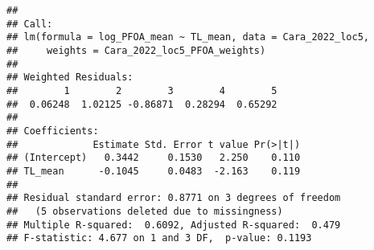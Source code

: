 \documentclass[
]{article}
\newenvironment{Shaded}{\begin{snugshade}}{\end{snugshade}}
\newcommand{\AttributeTok}[1]{\textcolor[rgb]{0.13,0.29,0.53}{#1}}
\newcommand{\DecValTok}[1]{\textcolor[rgb]{0.00,0.00,0.81}{#1}}
\newcommand{\FunctionTok}[1]{\textcolor[rgb]{0.13,0.29,0.53}{\textbf{#1}}}
\newcommand{\NormalTok}[1]{#1}
\newcommand{\OtherTok}[1]{\textcolor[rgb]{0.56,0.35,0.01}{#1}}
\newcommand{\SpecialCharTok}[1]{\textcolor[rgb]{0.81,0.36,0.00}{\textbf{#1}}}
\newcommand{\StringTok}[1]{\textcolor[rgb]{0.31,0.60,0.02}{#1}}
\begin{document}
\begin{Shaded}
\end{Shaded}

\begin{verbatim}
## 
## Call:
## lm(formula = log_PFOA_mean ~ TL_mean, data = Cara_2022_loc5, 
##     weights = Cara_2022_loc5_PFOA_weights)
## 
## Weighted Residuals:
##        1        2        3        4        5 
##  0.06248  1.02125 -0.86871  0.28294  0.65292 
## 
## Coefficients:
##             Estimate Std. Error t value Pr(>|t|)
## (Intercept)   0.3442     0.1530   2.250    0.110
## TL_mean      -0.1045     0.0483  -2.163    0.119
## 
## Residual standard error: 0.8771 on 3 degrees of freedom
##   (5 observations deleted due to missingness)
## Multiple R-squared:  0.6092, Adjusted R-squared:  0.479 
## F-statistic: 4.677 on 1 and 3 DF,  p-value: 0.1193
\end{verbatim}
\end{document}
